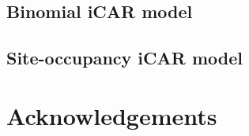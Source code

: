 \documentclass[a4paper, 12pt, leqno]{article}\usepackage[]{graphicx}\usepackage[]{color}
\begin{document}
\subsection{Binomial iCAR model}

\subsection{Site-occupancy iCAR model}

\newpage

\section{Acknowledgements}

\newpage



\end{document}
